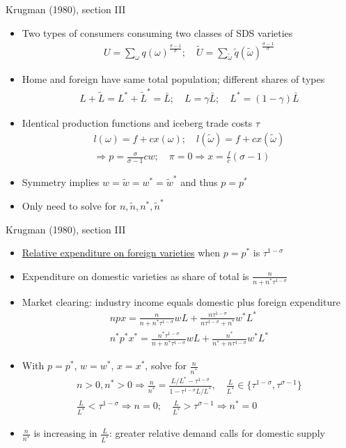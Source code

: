 \documentclass[10pt,notes=hide]{beamer}
\begin{document}
\begin{frame}{Krugman (1980), section III}
\begin{itemize}
	\item Two types of consumers consuming two classes of SDS varieties
	\begin{align*}U = \sum_{\omega} q(\omega)^{\frac{\sigma-1}{\sigma}} ; \quad \tilde{U} = \sum_{\tilde{\omega}} \tilde{q}(\tilde{\omega})^{\frac{\sigma-1}{\sigma}} \end{align*}
	\item Home and foreign have same total population; different shares of types
	\begin{align*}L + \tilde{L} = L^* + \tilde{L}^{*} = \bar{L} ; \quad L = \gamma \bar{L} ; \quad L^* = (1-\gamma)\bar{L}  \end{align*}
	\item Identical production functions and iceberg trade costs $\tau$
	\begin{align*} l(\omega) = f + c x(\omega) ; \quad l(\tilde{\omega}) = f + c x(\tilde{\omega}) \\
	\Rightarrow p = \frac{\sigma}{\sigma-1} c w ; \quad \pi=0\Rightarrow x = \frac{f}{c}\left(\sigma-1\right)
	\end{align*}
	\item Symmetry implies $w = \tilde{w} = w^* = \tilde{w}^*$ and thus $p=p^*$
	\item Only need to solve for $n, \tilde{n}, n^*, \tilde{n}^{*}$
\end{itemize}
\end{frame}
\begin{frame}{Krugman (1980), section III}
\begin{itemize}
	\item \href{http://www.columbia.edu/~jid2106/td/dixitstiglitzbasics.pdf}{Relative expenditure on foreign varieties} when $p=p^*$ is $\tau^{1-\sigma}$
	\item Expenditure on domestic varieties as share of total is $\frac{n}{n + n^*\tau^{1-\sigma}}$
	\item Market clearing: industry income equals domestic plus foreign expenditure
	\begin{align*}
	npx = \frac{n}{n + n^*\tau^{1-\sigma}} w L + \frac{n\tau^{1-\sigma}}{n\tau^{1-\sigma} + n^*} w^* L^* \\
	n^*p^*x^* = \frac{n^*\tau^{1-\sigma}}{n + n^*\tau^{1-\sigma}} w L + \frac{n^*}{n^* + n\tau^{1-\sigma}} w^* L^*
	\end{align*}
	\item With $p=p^*$, $w=w^*$, $x=x^*$, solve for $\frac{n}{n^*}$
	\begin{align*}
	n>0,n^*>0 \Rightarrow \frac{n}{n^*} = \frac{L/L^* - \tau^{1-\sigma}}{1 - \tau^{1-\sigma}L/L^*}, \quad \frac{L}{L^*} \in \{\tau^{1-\sigma},\tau^{\sigma-1}\} \\
	 \frac{L}{L^*} < \tau^{1-\sigma} \Rightarrow n = 0 ; \quad \frac{L}{L^*} > \tau^{\sigma-1} \Rightarrow n^* = 0 
	\end{align*}
	\item $\frac{n}{n^*}$ is increasing in $\frac{L}{L^*}$: greater relative demand calls for domestic supply
\end{itemize}
\end{frame}
\end{document}
